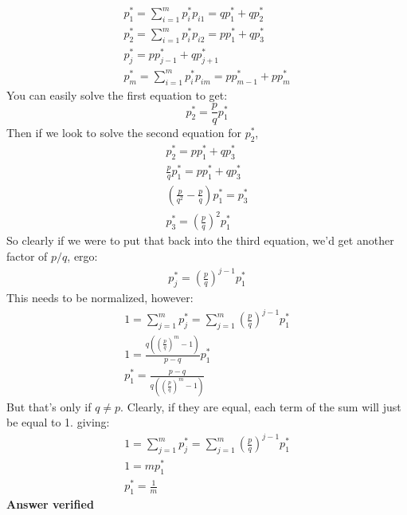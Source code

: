 \begin{eqnarray}
	p_1^* = \sum_{i=1}^{m} p_i^* p_{i1} = q p_1^* + q p_2^* \\
	p_2^* = \sum_{i=1}^{m} p_i^* p_{i2} = p p_1^* + q p_3^* \\
	p_j^* = p p_{j-1}^* + q p_{j+1}^* \\
	p_m^* = \sum_{i=1}^{m} p_i^* p_{im} = p p_{m-1}^* + p p_{m}^*
\end{eqnarray}
You can easily solve the first equation to get:
\begin{equation}
	p_2^* =\frac{p}{q} p_1^*
\end{equation}
Then if we look to solve the second equation for $p_2^*$, 
\begin{eqnarray}
	p_2^*  = p p_1^* + q p_3^* \\
	\frac{p}{q} p_1^* = p p_1^* + q p_3^* \\
	\left( \frac{p}{q^2} - \frac{p}{q} \right) p_1^* = p_3^* \\
	p_3^* = \left( \frac{p}{q} \right)^2 p_1^*
\end{eqnarray}
So clearly if we were to put that back into the third equation, we'd get another factor of $p/q$, ergo:
\begin{eqnarray}
	p_j^* = \left( \frac{p}{q} \right)^{j-1}p_1^*
\end{eqnarray}
This needs to be normalized, however:
\begin{eqnarray}
	1 = \sum_{j = 1}^m p_j^* = \sum_{j = 1}^m \left( \frac{p}{q} \right)^{j-1}p_1^* \\
	1 = \frac{q \left(\left(\frac{p}{q}\right)^m-1\right)}{p-q} p_1^* \\
	p_1^* = \frac{p-q}{q \left(\left(\frac{p}{q}\right)^m-1\right)}
\end{eqnarray}
But that's only if $q \neq p$.  Clearly, if they are equal, each term of the sum will just be equal to 1. giving:
\begin{eqnarray}
	1 = \sum_{j = 1}^m p_j^* = \sum_{j = 1}^m \left( \frac{p}{q} \right)^{j-1}p_1^* \\
	1 = m p_1^* \\
	p_1^* = \frac{1}{m} 
\end{eqnarray}
\textbf{Answer verified}

